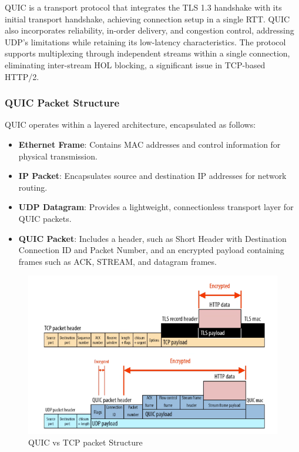 QUIC is a transport protocol that integrates the TLS 1.3 handshake with its initial transport handshake, achieving connection setup in a single RTT. QUIC also incorporates reliability, in-order delivery, and congestion control, addressing UDP’s limitations while retaining its low-latency characteristics. The protocol supports multiplexing through independent streams within a single connection, eliminating inter-stream HOL blocking, a significant issue in TCP-based HTTP/2. 

\subsubsection{QUIC Packet Structure}

QUIC operates within a layered architecture, encapsulated as follows:

\begin{itemize}
    \item \textbf{Ethernet Frame}: Contains MAC addresses and control information for physical transmission.
    \item \textbf{IP Packet}: Encapsulates source and destination IP addresses for network routing.
    \item \textbf{UDP Datagram}: Provides a lightweight, connectionless transport layer for QUIC packets.
    \item \textbf{QUIC Packet}: Includes a header, such as Short Header with Destination Connection ID and Packet Number, and an encrypted payload containing frames such as ACK, STREAM, and datagram frames.
\end{itemize}

\begin{figure}[H]
\caption{QUIC vs TCP packet Structure}
\centering
\includegraphics[width=1\textwidth]{SOA/quicntcp.png}
\end{figure}


